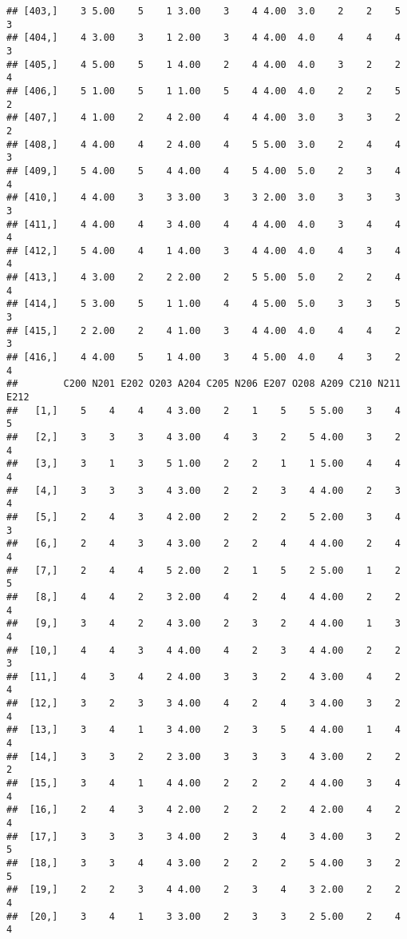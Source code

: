 \documentclass[]{article}
\begin{document}
\begin{verbatim}
## [403,]    3 5.00    5    1 3.00    3    4 4.00  3.0    2    2    5    3
## [404,]    4 3.00    3    1 2.00    3    4 4.00  4.0    4    4    4    3
## [405,]    4 5.00    5    1 4.00    2    4 4.00  4.0    3    2    2    4
## [406,]    5 1.00    5    1 1.00    5    4 4.00  4.0    2    2    5    2
## [407,]    4 1.00    2    4 2.00    4    4 4.00  3.0    3    3    2    2
## [408,]    4 4.00    4    2 4.00    4    5 5.00  3.0    2    4    4    3
## [409,]    5 4.00    5    4 4.00    4    5 4.00  5.0    2    3    4    4
## [410,]    4 4.00    3    3 3.00    3    3 2.00  3.0    3    3    3    3
## [411,]    4 4.00    4    3 4.00    4    4 4.00  4.0    3    4    4    4
## [412,]    5 4.00    4    1 4.00    3    4 4.00  4.0    4    3    4    4
## [413,]    4 3.00    2    2 2.00    2    5 5.00  5.0    2    2    4    4
## [414,]    5 3.00    5    1 1.00    4    4 5.00  5.0    3    3    5    3
## [415,]    2 2.00    2    4 1.00    3    4 4.00  4.0    4    4    2    3
## [416,]    4 4.00    5    1 4.00    3    4 5.00  4.0    4    3    2    4
##        C200 N201 E202 O203 A204 C205 N206 E207 O208 A209 C210 N211 E212
##   [1,]    5    4    4    4 3.00    2    1    5    5 5.00    3    4    5
##   [2,]    3    3    3    4 3.00    4    3    2    5 4.00    3    2    4
##   [3,]    3    1    3    5 1.00    2    2    1    1 5.00    4    4    4
##   [4,]    3    3    3    4 3.00    2    2    3    4 4.00    2    3    4
##   [5,]    2    4    3    4 2.00    2    2    2    5 2.00    3    4    3
##   [6,]    2    4    3    4 3.00    2    2    4    4 4.00    2    4    4
##   [7,]    2    4    4    5 2.00    2    1    5    2 5.00    1    2    5
##   [8,]    4    4    2    3 2.00    4    2    4    4 4.00    2    2    4
##   [9,]    3    4    2    4 3.00    2    3    2    4 4.00    1    3    4
##  [10,]    4    4    3    4 4.00    4    2    3    4 4.00    2    2    3
##  [11,]    4    3    4    2 4.00    3    3    2    4 3.00    4    2    4
##  [12,]    3    2    3    3 4.00    4    2    4    3 4.00    3    2    4
##  [13,]    3    4    1    3 4.00    2    3    5    4 4.00    1    4    4
##  [14,]    3    3    2    2 3.00    3    3    3    4 3.00    2    2    2
##  [15,]    3    4    1    4 4.00    2    2    2    4 4.00    3    4    4
##  [16,]    2    4    3    4 2.00    2    2    2    4 2.00    4    2    4
##  [17,]    3    3    3    3 4.00    2    3    4    3 4.00    3    2    5
##  [18,]    3    3    4    4 3.00    2    2    2    5 4.00    3    2    5
##  [19,]    2    2    3    4 4.00    2    3    4    3 2.00    2    2    4
##  [20,]    3    4    1    3 3.00    2    3    3    2 5.00    2    4    4

\end{verbatim}
\end{document}
